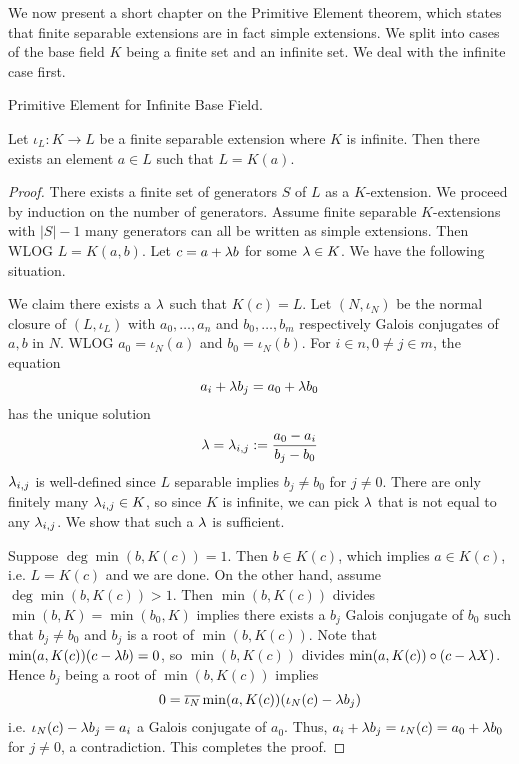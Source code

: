 \documentclass[../book.tex]{subfiles}
\begin{document}
We now present a short chapter on the Primitive Element theorem,
which states that finite separable extensions are in fact simple extensions.
We split into cases of the base field $K$ being a finite set and an infinite set. 
We deal with the infinite case first. 

\begin{thm} Primitive Element for Infinite Base Field.
    
    Let $\iota_L : K \to L$ be a finite separable extension where $K$ is infinite. 
    Then there exists an element $a \in L$ such that $L = K(a)$. 
\end{thm}
\begin{proof}
    
    There exists a finite set of generators $S$ of $L$ as a $K$-extension.
    We proceed by induction on the number of generators. 
    Assume finite separable $K$-extensions with $|S|-1$ many generators 
    can all be written as simple extensions. 
    Then WLOG $L = K(a, b)$. 
    Let $c = a + \lambda b$ for some $\lambda \in K$. 
    We have the following situation. 
    \begin{figure}[H]
        \centering
    \end{figure}
    We claim there exists a $\lambda$ such that $K(c) = L$. 
    Let $(N,\iota_N)$ be the normal closure of $(L,\iota_L)$
    with $a_0,\dots,a_n$ and $b_0,\dots,b_m$ respectively Galois conjugates of $a, b$ in $N$.
    WLOG $a_0 = \iota_N(a)$ and $b_0 = \iota_N(b)$.
    For $i \in n, 0 \neq j \in m$, the equation \[
        a_i + \lambda b_j = a_0 + \lambda b_0
    \]
    has the unique solution \[
        \lambda = \lambda_{i,j} := \frac{a_0 - a_i}{b_j - b_0}
    \]
    $\lambda_{i,j}$ is well-defined since $L$ separable implies $b_j \neq b_0$ for $j\neq0$.
    There are only finitely many $\lambda_{i,j} \in K$, so since $K$ is infinite, 
    we can pick $\lambda$ that is not equal to any $\lambda_{i,j}$. 
    We show that such a $\lambda$ is sufficient.
    
    Suppose $\deg\min(b,K(c)) = 1$. 
    Then $b \in K(c)$, which implies $a \in K(c)$, i.e. $L = K(c)$ and we are done. 
    On the other hand, assume $\deg\min(b,K(c)) > 1$. 
    Then $\min(b,K(c))$ divides $\min(b,K) = \min(b_0,K)$ implies
    there exists a $b_j$ Galois conjugate of $b_0$ such that 
    $b_j \neq b_0$ and $b_j$ is a root of $\min(b,K(c))$. 
    Note that $\min(a,K(c)) (c - \lambda b) = 0$,
    so $\min(b,K(c))$ divides $\min(a,K(c)) \circ (c - \lambda X)$.
    Hence $b_j$ being a root of $\min(b,K(c))$ implies
    \[ 0 = \overline{\iota_N} \min(a,K(c)) (\iota_N(c) - \lambda b_j) \]
    i.e. $\iota_N(c) - \lambda b_j = a_i$ a Galois conjugate of $a_0$.
    Thus, $a_i + \lambda b_j = \iota_N(c) = a_0 + \lambda b_0$ for $j \neq 0$, a contradiction. 
    This completes the proof. 
    
\end{proof}
\end{document}
